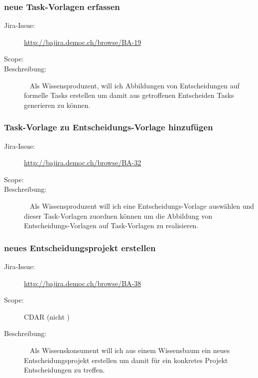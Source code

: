 	\subsubsection{neue Task-Vorlagen erfassen}
		\begin{description}
			\item[Jira-Issue:] \url{http://bajira.democ.ch/browse/BA-19}
			\item[Scope:] \eeppi
			\item[Beschreibung:]\ \newline
				Als Wissensproduzent,\newline
				will ich Abbildungen von Entscheidungen auf formelle Tasks erstellen\newline
				um damit aus getroffenen Entscheiden Tasks generieren zu können.
		\end{description}

	\subsubsection{Task-Vorlage zu Entscheidungs-Vorlage hinzufügen}
		\begin{description}
			\item[Jira-Issue:] \url{http://bajira.democ.ch/browse/BA-32}
			\item[Scope:] \eeppi
			\item[Beschreibung:]\ \newline
				Als Wissensproduzent\newline
				will ich eine Entscheidungs-Vorlage auswählen und dieser Task-Vorlagen zuordnen können\newline
				um die Abbildung von Entscheidungs-Vorlagen auf Task-Vorlagen zu realisieren.
		\end{description}

	\subsubsection{neues Entscheidungsprojekt erstellen}
		\begin{description}
			\item[Jira-Issue:] \url{http://bajira.democ.ch/browse/BA-38}
			\item[Scope:] CDAR (nicht \eeppi)
			\item[Beschreibung:]\ \newline
				Als Wissenskonsument\newline
				will ich aus einem Wissensbaum ein neues Entscheidungsprojekt erstellen\newline
				um damit für ein konkretes Projekt Entscheidungen zu treffen.
		\end{description}

